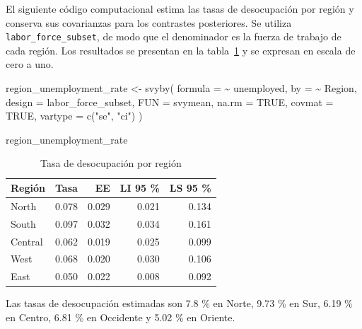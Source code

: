 \documentclass[
  spanish,
  11pt,
  letterpaper,
  oneside,
  open=any]{scrbook}
\newenvironment{Shaded}{\begin{snugshade}}{\end{snugshade}}
\newcommand{\AttributeTok}[1]{\textcolor[rgb]{0.40,0.45,0.13}{#1}}
\newcommand{\ConstantTok}[1]{\textcolor[rgb]{0.56,0.35,0.01}{#1}}
\newcommand{\FunctionTok}[1]{\textcolor[rgb]{0.28,0.35,0.67}{#1}}
\newcommand{\NormalTok}[1]{\textcolor[rgb]{0.00,0.23,0.31}{#1}}
\newcommand{\OtherTok}[1]{\textcolor[rgb]{0.00,0.23,0.31}{#1}}
\newcommand{\SpecialCharTok}[1]{\textcolor[rgb]{0.37,0.37,0.37}{#1}}
\newcommand{\StringTok}[1]{\textcolor[rgb]{0.13,0.47,0.30}{#1}}
\begin{document}
El siguiente código computacional estima las tasas de desocupación por
región y conserva sus covarianzas para los contrastes posteriores. Se
utiliza \texttt{labor\_force\_subset}, de modo que el denominador es la
fuerza de trabajo de cada región. Los resultados se presentan en la
tabla~\ref{tbl-tasa-desocupacion-region} y se expresan en escala de cero
a uno.

\begin{Shaded}
\begin{Highlighting}[]
\NormalTok{region\_unemployment\_rate }\OtherTok{\textless{}{-}} \FunctionTok{svyby}\NormalTok{(}
  \AttributeTok{formula =} \SpecialCharTok{\textasciitilde{}}\NormalTok{ unemployed,}
  \AttributeTok{by =} \SpecialCharTok{\textasciitilde{}}\NormalTok{ Region,}
  \AttributeTok{design =}\NormalTok{ labor\_force\_subset,}
  \AttributeTok{FUN =}\NormalTok{ svymean,}
  \AttributeTok{na.rm =} \ConstantTok{TRUE}\NormalTok{,}
  \AttributeTok{covmat =} \ConstantTok{TRUE}\NormalTok{,}
  \AttributeTok{vartype =} \FunctionTok{c}\NormalTok{(}\StringTok{"se"}\NormalTok{, }\StringTok{"ci"}\NormalTok{)}
\NormalTok{)}

\NormalTok{region\_unemployment\_rate}
\end{Highlighting}
\end{Shaded}

{

\begin{longtable}[]{@{}lrrrr@{}}

\caption{\label{tbl-tasa-desocupacion-region}Tasa de desocupación por
región}

\tabularnewline

\toprule\noalign{}
Región & Tasa & EE & LI 95 \% & LS 95 \% \\
\midrule\noalign{}
\endhead
\bottomrule\noalign{}
\endlastfoot
North & 0.078 & 0.029 & 0.021 & 0.134 \\
South & 0.097 & 0.032 & 0.034 & 0.161 \\
Central & 0.062 & 0.019 & 0.025 & 0.099 \\
West & 0.068 & 0.020 & 0.030 & 0.106 \\
East & 0.050 & 0.022 & 0.008 & 0.092 \\

\end{longtable}

}

Las tasas de desocupación estimadas son 7.8 \% en Norte, 9.73 \% en Sur,
6.19 \% en Centro, 6.81 \% en Occidente y 5.02 \% en Oriente.
\end{document}
